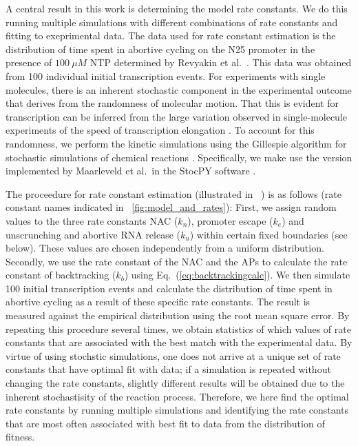 A central result in this work is determining the model rate constants. We do
this running multiple simulations with different combinations of rate
constants and fitting to exeprimental data. The data used for rate constant
estimation is the distribution of time spent in abortive cycling on the N25
promoter in the presence of $100\ \mu M$ NTP determined by Revyakin et al.\
\cite{revyakin_abortive_2006}. This data was obtained from 100 individual
initial transcription events. For experiments with single molecules, there is
an inherent stochastic component in the experimental outcome that derives from
the randomness of molecular motion. That this is evident for transcription can
be inferred from the large variation observed in single-molecule experiments
of the speed of transcription elongation \cite{adelman_single_2002,
tolic-norrelykke_diversity_2004}. To account for this randomness, we perform
the kinetic simulations using the Gillespie algorithm for stochastic
simulations of chemical reactions \cite{gillespie_exact_1977}. Specifically,
we make use the version implemented by Maarleveld et al.\ in the StocPY
software \cite{maarleveld_stochpy:_2013}.

The proceedure for rate constant estimation (illustrated in
\FIG~\SONEFIGREF) is as follows (rate constant names indicated in
\FIG~\ref{fig:model_and_rates}): First, we assign random values to the three
rate constants NAC ($k_n$), promoter escape ($k_e$) and unscrunching and
abortive RNA release ($k_u$) within certain fixed boundaries (see below).
These values are chosen independently from a uniform distribution. Secondly,
we use the rate constant of the NAC and the APs to calculate the rate constant
of backtracking ($k_b$) using Eq.~(\ref{eq:backtrackingcalc}). We then
simulate 100 initial transcription events and calculate the distribution of
time spent in abortive cycling as a result of these specific rate constants.
The result is measured against the empirical distribution
\cite{revyakin_abortive_2006} using the root mean square error. By
repeating this procedure several times, we obtain statistics of which values
of rate constants that are associated with the best match with the
experimental data. By virtue of using stochstic simulations, one does not
arrive at a unique set of rate constants that have optimal fit with data; if a
simulation is repeated without changing the rate constants, slightly different
results will be obtained due to the inherent stochastisity of the reaction
process. Therefore, we here find the optimal rate constants by running
multiple simulations and identifying the rate constants that are most often
associated with best fit to data from the distribution of fitness.

